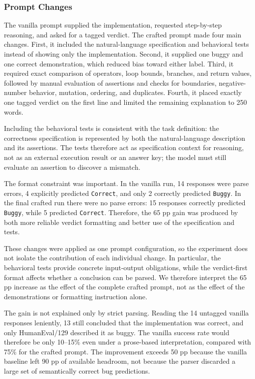 \documentclass[sigconf,nonacm]{acmart}
\begin{document}
\subsubsection{Prompt Changes}\hfill\break
The vanilla prompt supplied the implementation, requested step-by-step
reasoning, and asked for a tagged verdict. The crafted prompt made four main
changes. First, it included the natural-language specification and behavioral
tests instead of showing only the implementation. Second, it supplied one
buggy and one correct demonstration, which reduced bias toward either label.
Third, it required exact comparison of operators, loop bounds, branches, and
return values, followed by manual evaluation of assertions and checks for
boundaries, negative-number behavior, mutation, ordering, and duplicates.
Fourth, it placed exactly one tagged verdict on the first line and limited the
remaining explanation to 250 words.

Including the behavioral tests is consistent with the task definition: the
correctness specification is represented by both the natural-language
description and its assertions. The tests therefore act as specification
context for reasoning, not as an external execution result or an answer key;
the model must still evaluate an assertion to discover a mismatch.

The format constraint was important. In the vanilla run, 14 responses were
parse errors, 4 explicitly predicted \texttt{Correct}, and only 2 correctly
predicted \texttt{Buggy}. In the final crafted run there were no parse errors:
15 responses correctly predicted \texttt{Buggy}, while 5 predicted
\texttt{Correct}. Therefore, the 65 pp gain was produced by both more reliable
verdict formatting and better use of the specification and tests.

These changes were applied as one prompt configuration, so the experiment does
not isolate the contribution of each individual change. In particular, the
behavioral tests provide concrete input-output obligations, while the
verdict-first format affects whether a conclusion can be parsed. We therefore
interpret the 65 pp increase as the effect of the complete crafted prompt, not
as the effect of the demonstrations or formatting instruction alone.

The gain is not explained only by strict parsing. Reading the 14 untagged
vanilla responses leniently, 13 still concluded that the implementation was
correct, and only HumanEval/129 described it as buggy. The vanilla success rate
would therefore be only 10--15\% even under a prose-based interpretation,
compared with 75\% for the crafted prompt. The improvement exceeds 50 pp
because the vanilla baseline left 90 pp of available headroom, not because the
parser discarded a large set of semantically correct bug predictions.
\end{document}
